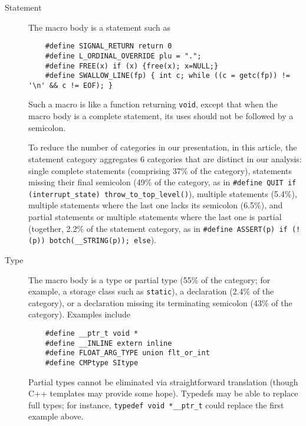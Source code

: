\documentclass[10pt]{article}
\def\typeofdocument{article}    %
\begin{document}
\begin{description}
\item[Statement]\label{item:statement-category}
  The macro body is a statement such as
\begin{verbatim}
    #define SIGNAL_RETURN return 0
    #define L_ORDINAL_OVERRIDE plu = ".";
    #define FREE(x) if (x) {free(x); x=NULL;}
    #define SWALLOW_LINE(fp) { int c; while ((c = getc(fp)) != '\n' && c != EOF); }
\end{verbatim}
  Such a macro is like a function returning {\tt void}, except that when
  the macro body is a complete statement, its uses should not be followed
  by a semicolon.
    
  To reduce the number of categories in our presentation, in this
  \typeofdocument, the statement
  category aggregates 6 categories that are distinct in our analysis:
  single complete statements (comprising 37\% of the category), 
  statements missing their final semicolon (49\% of the category, as in
  {\tt \#define QUIT if (\verb|interrupt_state|)
  \verb|throw_to_top_level|()}), multiple statements (5.4\%), multiple
statements where the last one lacks its semicolon (6.5\%), and partial
statements or multiple statements where the last one is partial
(together, 2.2\% of the statement category, as in {\tt \#define
ASSERT(p) if (!(p)) botch(\verb|__STRING|(p)); else}).

\item[Type] 
  The macro body is a type or partial type (55\% of the category; for
  example, a storage class such as {\tt static}), a declaration
  (2.4\% of the category), or a declaration missing its terminating
  semicolon (43\% of the category).  Examples include
\begin{verbatim}
    #define __ptr_t void *
    #define __INLINE extern inline
    #define FLOAT_ARG_TYPE union flt_or_int
    #define CMPtype SItype
\end{verbatim}
  Partial types cannot be eliminated via straightforward translation
  (though C++ templates may provide some hope).  Typedefs may be able to
  replace full types; for instance, {\tt typedef void \verb|*__ptr_t|} could
  replace the first example above.



\end{description}
\end{document}
